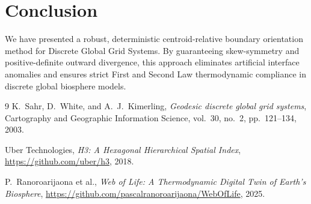 \documentclass[10pt,twocolumn,a4paper]{article}
\begin{document}
\section{Conclusion}
We have presented a robust, deterministic centroid-relative boundary orientation method for Discrete Global Grid Systems. By guaranteeing skew-symmetry and positive-definite outward divergence, this approach eliminates artificial interface anomalies and ensures strict First and Second Law thermodynamic compliance in discrete global biosphere models.

\begin{thebibliography}{9}
K.~Sahr, D.~White, and A.~J.~Kimerling,
\emph{Geodesic discrete global grid systems},
Cartography and Geographic Information Science, vol.~30, no.~2, pp.~121--134, 2003.

Uber Technologies,
\emph{H3: A Hexagonal Hierarchical Spatial Index},
\url{https://github.com/uber/h3}, 2018.

P.~Ranoroarijaona et al.,
\emph{Web of Life: A Thermodynamic Digital Twin of Earth's Biosphere},
\url{https://github.com/pascalranoroarijaona/WebOfLife}, 2025.
\end{thebibliography}
\end{document}
